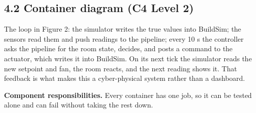 \documentclass[11pt]{article}
\begin{document}
\subsection{4.2 Container diagram (C4 Level 2)}


The loop in Figure 2: the simulator writes the true values into BuildSim; the sensors read them and push
readings to the pipeline; every 10 s the controller asks the pipeline for the room state,
decides, and posts a command to the actuator, which writes it into BuildSim. On its next tick
the simulator reads the new setpoint and fan, the room reacts, and the next reading shows it.
That feedback is what makes this a cyber-physical system rather than a dashboard.


\textbf{Component responsibilities.} Every container has one job, so it can be tested alone and can
fail without taking the rest down.
\end{document}
